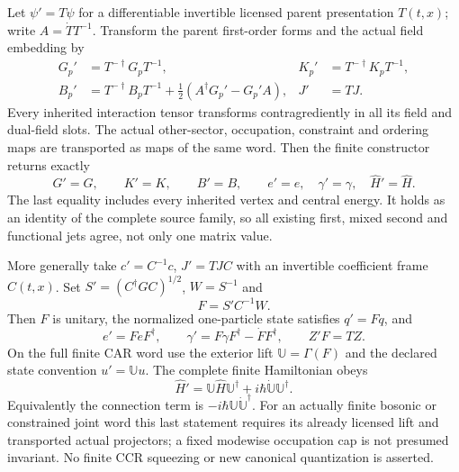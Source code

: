 \documentclass[12pt,a4paper]{article}
\begin{document}
\begin{theorem}
\label{p4:thm:v4118-transported-embedding-covariance}
Let $\psi'=T\psi$ for a differentiable invertible licensed parent
presentation $T(t,x)$; write $A=\dot T T^{-1}$. Transform the parent
first-order forms and the actual field embedding by
\begin{align*}
 G_p'&=T^{-\dagger}G_pT^{-1},&
 K_p'&=T^{-\dagger}K_pT^{-1},\\
 B_p'&=T^{-\dagger}B_pT^{-1}
                  +\tfrac12(A^\dagger G_p'-G_p'A),& J'&=TJ.
\end{align*}
Every inherited interaction tensor transforms contragrediently in all
its field and dual-field slots. The actual other-sector, occupation,
constraint and ordering maps are transported as maps of the same word.
Then the finite constructor returns exactly
\[
 G'=G,\qquad K'=K,\qquad B'=B,\qquad
 e'=e,\quad\gamma'=\gamma,\quad\widehat H'=\widehat H.
\]
The last equality includes every inherited vertex and central energy.
It holds as an identity of the complete source family, so all existing
first, mixed second and functional jets agree, not only one matrix value.

More generally take $c'=C^{-1}c$, $J'=TJC$ with an invertible coefficient
frame $C(t,x)$. Set $S'=(C^\dagger GC)^{1/2}$, $W=S^{-1}$ and
\[
 F=S'C^{-1}W.
\]
Then $F$ is unitary, the normalized one-particle state satisfies $q'=Fq$,
and
\[
 e'=FeF^\dagger,\qquad
 \gamma'=F\gamma F^\dagger-\dot F F^\dagger,\qquad
 Z'F=TZ.
\]
On the full finite CAR word use the exterior lift $\mathbb U=\Gamma(F)$
and the declared state convention $u'=\mathbb Uu$. The complete finite
Hamiltonian obeys
\[
 \boxed{\widehat H'=\mathbb U\widehat H\mathbb U^\dagger
                         +i\hbar\dot{\mathbb U}\mathbb U^\dagger.}
\]
Equivalently the connection term is
$-i\hbar\mathbb U\dot{\mathbb U}^\dagger$.
For an actually finite bosonic or constrained joint word this last
statement requires its already licensed lift and transported actual
projectors; a fixed modewise occupation cap is not presumed invariant.
No finite CCR squeezing or new canonical quantization is asserted.
\end{theorem}
\end{document}

